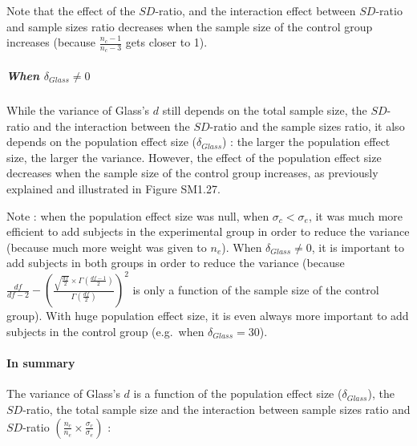 \documentclass[
  english,
  man,mask,floatsintext]{apa6}
\let\oldparagraph\paragraph
\renewcommand{\paragraph}[1]{\oldparagraph{#1}\mbox{}}
\let\oldsubparagraph\subparagraph
\renewcommand{\subparagraph}[1]{\oldsubparagraph{#1}\mbox{}}
\begin{document}
Note that the effect of the \(SD\)-ratio, and the interaction effect between \(SD\)-ratio and sample sizes ratio decreases when the sample size of the control group increases (because \(\frac{n_c-1}{n_c-3}\) gets closer to 1).

\hypertarget{when-delta_glass-neq-0-2}{%
\subparagraph{\texorpdfstring{When \(\delta_{Glass} \neq 0\)}{When \textbackslash delta\_\{Glass\} \textbackslash neq 0}}\label{when-delta_glass-neq-0-2}}

While the variance of Glass's \(d\) still depends on the total sample size, the \(SD\)-ratio and the interaction between the \(SD\)-ratio and the sample sizes ratio, it also depends on the population effect size (\(\delta_{Glass}\)) : the larger the population effect size, the larger the variance. However, the effect of the population effect size decreases when the sample size of the control group increases, as previously explained and illustrated in Figure SM1.27.

Note : when the population effect size was null, when \(\sigma_c<\sigma_e\), it was much more efficient to add subjects in the experimental group in order to reduce the variance (because much more weight was given to \(n_e\)). When \(\delta_{Glass} \neq 0\), it is important to add subjects in both groups in order to reduce the variance (because \(\frac{df}{df-2} - \left( \frac{\sqrt{\frac{df}{2}} \times \Gamma \left(\frac{df-1}{2} \right)}{\Gamma \left( \frac{df}{2}\right)}\right)^2\) is only a function of the sample size of the control group). With huge population effect size, it is even always more important to add subjects in the control group (e.g.~when \(\delta_{Glass}=30\)).

\hypertarget{in-summary-2}{%
\paragraph{In summary}\label{in-summary-2}}

The variance of Glass's \(d\) is a function of the population effect size (\(\delta_{Glass}\)), the \(SD\)-ratio, the total sample size and the interaction between sample sizes ratio and \(SD\)-ratio \(\left(\frac{n_c}{n_e}\times\frac{\sigma_c}{\sigma_e} \right)\) :
\end{document}
